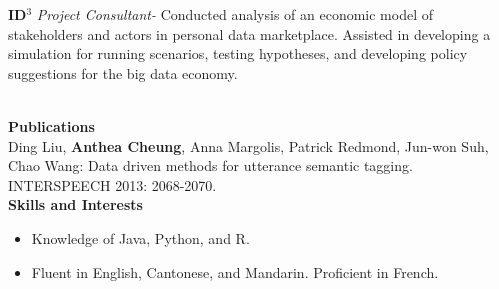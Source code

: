 \documentclass[letter, 11pt]{article}
\begin{document}
\parbox[l]{\textwidth}{
\large \textbf{ID$^3$} 
\textit{Project Consultant- }
Conducted analysis of an economic model of stakeholders and actors in personal data marketplace. Assisted in developing a simulation for running scenarios, testing hypotheses, and developing policy suggestions for the big data economy.
}
\vspace{0.4cm}\\

\Large \textbf{Publications}
\vspace{0.4cm}\\
\normalsize
Ding Liu, \textbf{Anthea Cheung}, Anna Margolis, Patrick Redmond, Jun-won Suh, Chao Wang: Data driven methods for utterance semantic tagging. INTERSPEECH 2013: 2068-2070.
\vspace{0.4cm}\\

\Large \textbf{Skills and Interests}
\vspace{0.4cm}\\
\normalsize
\begin{itemize}
\item Knowledge of Java, Python, and R.
\item Fluent in English, Cantonese, and Mandarin. Proficient in French.
  
\end{itemize}
\end{document}
